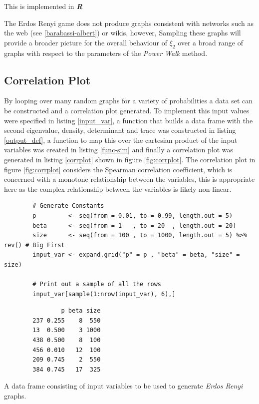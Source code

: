 \documentclass[11pt]{report}
\begin{document}
This is implemented in \textbf{\emph{R}} \cite[IgraphManualPagesa]{IgraphManualPages}

The Erdos Renyi game does not produce graphs consistent with networks such as
the web (see \ref{barabassi-albert}) or wikis, however, Sampling these graphs will
provide a broader picture for the overall behaviour of \(\xi_{2}\) over a broad
range of graphs with respect to the parameters of the \emph{Power Walk} method.

\subsection{Correlation Plot}
\label{correlation-plot}
By looping over many random graphs for a variety of probabilities a data set can
be constructed and a correlation plot generated. To implement this input values
were specified in listing \ref{input_var}, a function that builds a data frame with
the second eigenvalue, density, determinant and trace was constructed in listing
\ref{output_def}, a function to map this over the cartesian product of the input
variables was created in listing \ref{func-sim} and finally a correlation plot
was generated in listing \ref{corrplot} shown in figure \ref{fig:corrplot}. The
correlation plot in figure \ref{fig:corrplot} considers the Spearman correlation
coefficient, which is concerned with a monotone relationship between the
variables, this is appropriate here as the complex relationship between the
variables is likely non-linear.


\begin{listing}[htbp]
    \begin{tcolorbox}
        \begin{verbatim}
        # Generate Constants
        p         <- seq(from = 0.01, to = 0.99, length.out = 5)
        beta      <- seq(from = 1   , to = 20  , length.out = 20)
        size      <- seq(from = 100 , to = 1000, length.out = 5) %>% rev() # Big First
        input_var <- expand.grid("p" = p , "beta" = beta, "size" = size)

        # Print out a sample of all the rows
        input_var[sample(1:nrow(input_var), 6),]
        \end{verbatim}
    \tcblower
        \begin{verbatim}
                p beta size
        237 0.255    8  550
        13  0.500    3 1000
        438 0.500    8  100
        456 0.010   12  100
        209 0.745    2  550
        384 0.745   17  325
        \end{verbatim}
    \end{tcolorbox}
\caption{\label{input_var}A data frame consisting of input variables to be used to generate \emph{Erdos Renyi} graphs.}
\end{listing}
\end{document}

